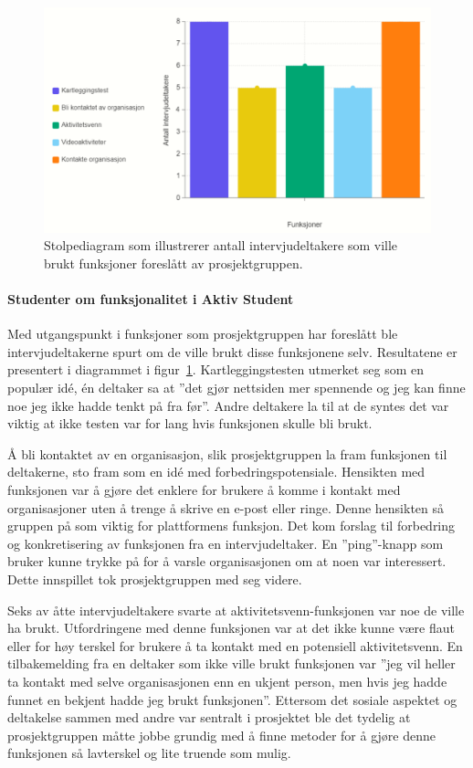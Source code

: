 \begin{figure}[H]
\includegraphics[width=\textwidth]{Illustrasjoner/diagram-funksjoner.png}
\caption{Stolpediagram som illustrerer antall intervjudeltakere som ville brukt funksjoner foreslått av prosjektgruppen.}
\label{fig:diagram-funksjoner}
\end{figure}

\paragraph{Studenter om funksjonalitet i Aktiv Student}

Med utgangspunkt i funksjoner som prosjektgruppen har foreslått ble intervjudeltakerne spurt om de ville brukt disse funksjonene selv. Resultatene er presentert i diagrammet i figur~\ref{fig:diagram-funksjoner}. Kartleggingstesten utmerket seg som en populær idé, én deltaker sa at ''det gjør nettsiden mer spennende og jeg kan finne noe jeg ikke hadde tenkt på fra før''. Andre deltakere la til at de syntes det var viktig at ikke testen var for lang hvis funksjonen skulle bli brukt.

Å bli kontaktet av en organisasjon, slik prosjektgruppen la fram funksjonen til deltakerne, sto fram som en idé med forbedringspotensiale. Hensikten med funksjonen var å gjøre det enklere for brukere å komme i kontakt med organisasjoner uten å trenge å skrive en e-post eller ringe. Denne hensikten så gruppen på som viktig for plattformens funksjon. Det kom forslag til forbedring og konkretisering av funksjonen fra en intervjudeltaker. En ''ping''-knapp som bruker kunne trykke på for å varsle organisasjonen om at noen var interessert. Dette innspillet tok prosjektgruppen med seg videre.

Seks av åtte intervjudeltakere svarte at aktivitetsvenn-funksjonen var noe de ville ha brukt. Utfordringene med denne funksjonen var at det ikke kunne være flaut eller for høy terskel for brukere å ta kontakt med en potensiell aktivitetsvenn. En tilbakemelding fra en deltaker som ikke ville brukt funksjonen var ''jeg vil heller ta kontakt med selve organisasjonen enn en ukjent person, men hvis jeg hadde funnet en bekjent hadde jeg brukt funksjonen''. Ettersom det sosiale aspektet og deltakelse sammen med andre var sentralt i prosjektet ble det tydelig at prosjektgruppen måtte jobbe grundig med å finne metoder for å gjøre denne funksjonen så lavterskel og lite truende som mulig. 

